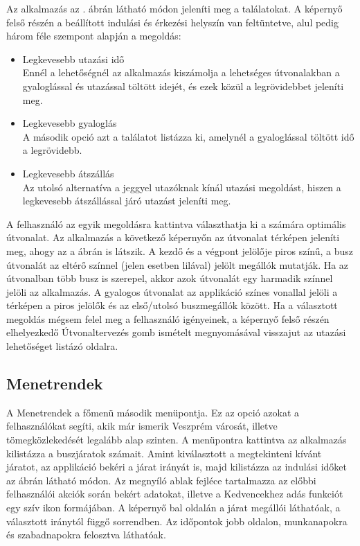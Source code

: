 Az alkalmazás az . ábrán látható módon jeleníti meg a találatokat.
A képernyő felső részén a beállított indulási és érkezési helyszín van feltüntetve, alul pedig három féle szempont alapján a megoldás:
\begin{itemize}
	\item Legkevesebb utazási idő
	\\Ennél a lehetőségnél az alkalmazás kiszámolja a lehetséges útvonalakban a gyaloglással és utazással töltött idejét, és ezek közül a legrövidebbet jeleníti meg.
	\item Legkevesebb gyaloglás
	\\A második opció azt a találatot listázza ki, amelynél a gyaloglással töltött idő a legrövidebb.
	\item Legkevesebb átszállás
	\\Az utolsó alternatíva a jeggyel utazóknak kínál utazási megoldást, hiszen a legkevesebb átszállással járó utazást jeleníti meg.
\end{itemize}
A felhasználó az egyik megoldásra kattintva választhatja ki a számára optimális útvonalat.
Az alkalmazás a következő képernyőn az útvonalat térképen jeleníti meg, ahogy az a   ábrán is látszik.
A kezdő és a végpont jelölője piros színű, a busz útvonalát az eltérő színnel (jelen esetben lilával) jelölt megállók mutatják.
Ha az útvonalban több busz is szerepel, akkor azok útvonalát egy harmadik színnel jelöli az alkalmazás.
A gyalogos útvonalat az applikáció színes vonallal jelöli a térképen a piros jelölők és az első/utolsó buszmegállók között.
Ha a választott megoldás mégsem felel meg a felhasználó igényeinek, a képernyő felső részén elhelyezkedő Útvonaltervezés gomb ismételt megnyomásával visszajut az utazási lehetőséget listázó oldalra.
\subsection {Menetrendek}
\label {menetrendek}
A Menetrendek a főmenü második menüpontja.
Ez az opció azokat a felhasználókat segíti, akik már ismerik Veszprém városát, illetve tömegközlekedését legalább alap szinten.
A menüpontra kattintva az alkalmazás kilistázza a buszjáratok számait.
Amint kiválasztott a megtekinteni kívánt járatot, az applikáció bekéri a járat irányát is, majd kilistázza az indulási időket az  ábrán látható módon.
Az megnyíló ablak fejléce tartalmazza az előbbi felhasználói akciók során bekért adatokat, illetve a Kedvencekhez adás funkciót egy szív ikon formájában.
A képernyő bal oldalán a járat megállói láthatóak, a választott iránytól függő sorrendben.
Az időpontok jobb oldalon, munkanapokra és szabadnapokra felosztva láthatóak.


